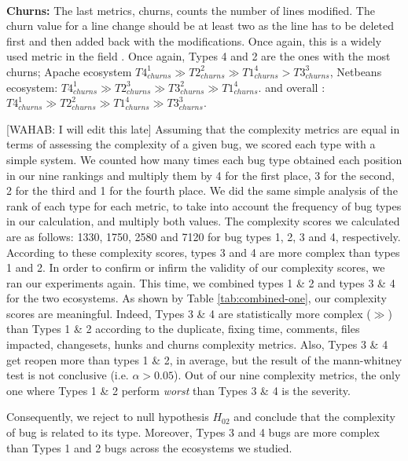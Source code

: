 \\ \vspace{0.1cm} {\bf Churns: } The last metrics, churns, counts the number of lines modified.
The churn value for a line change should be at least two as the line has to be deleted first and then added back with the modifications.
Once again, this is a widely used metric in the field \cite{Kim2006,Pan2008,Jung2009, Rosen2015}.
Once again, Types 4 and 2 are the ones with the most churns; Apache ecosystem
$
T4_{churns}^1
 \gg
T2_{churns}^2
 \gg
T1_{churns}^4
 >
T3_{churns}^3
$,
Netbeans ecosystem:
$
T4_{churns}^1
 \gg
T2_{churns}^3
 \gg
T3_{churns}^2
 \gg
T1_{churns}^4
$.
and overall :
$
T4_{churns}^1
 \gg
T2_{churns}^2
 \gg
T1_{churns}^4
 \gg
T3_{churns}^3
$.


[WAHAB: I will edit this late]
Assuming that the complexity metrics are equal in terms of assessing the complexity of a given bug, we scored each type with a simple system.
We counted how many times each bug type obtained each position in our nine rankings and multiply them by 4 for the first place, 3 for the second, 2 for the third and 1 for the fourth place.
We did the same simple analysis of the rank of each type for each metric, to take into account the frequency of bug types in our calculation, and multiply both values.
The complexity scores we calculated are as follows: 1330, 1750, 2580 and 7120 for bug types 1, 2, 3 and 4, respectively.
According to these complexity scores, types 3 and 4 are more complex than types 1 and 2.
In order to confirm or infirm the validity of our complexity scores, we ran our experiments again.
This time, we combined types 1 \& 2 and types 3 \& 4 for the two ecosystems.
As shown by Table \ref{tab:combined-one}, our complexity scores are meaningful.
Indeed, Types 3 \& 4 are statistically more complex ($\gg$) than Types 1 \& 2 according to the duplicate, fixing time, comments, files impacted, changesets, hunks and churns complexity metrics.
Also, Types 3 \& 4 get reopen more than  types 1 \& 2, in average, but the result of the mann-whitney test is not conclusive (i.e. $\alpha>0.05$).
Out of our nine complexity metrics, the only one where Types 1 \& 2 perform {\it worst} than Types 3 \& 4 is the severity.

Consequently, we reject to null hypothesis $H_{02}$ and conclude that the complexity of bug is related to its type.
Moreover, Types 3 and 4  bugs are more complex than Types 1 and 2 bugs across the ecosystems we studied.
